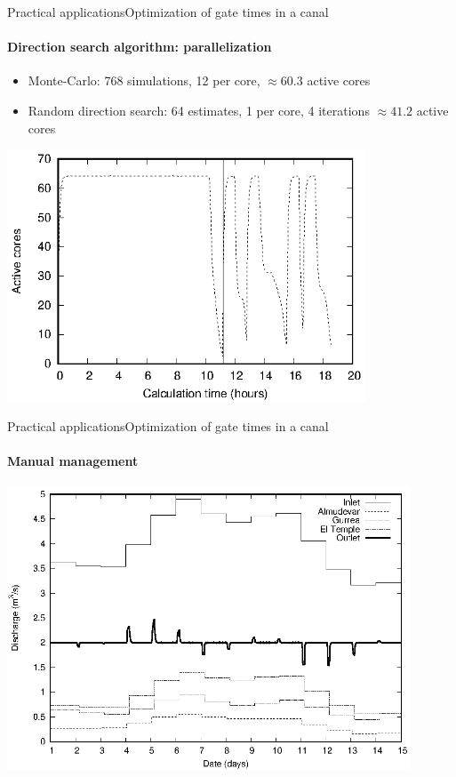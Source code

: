 \documentclass[10pt]{beamer}
\begin{document}
\begin{frame}{Practical applications}{Optimization of gate times in a canal}
	\framesubtitle{Direction search algorithm: parallelization}
	\begin{itemize}
		\item Monte-Carlo: 768 simulations, 12 per core, $\approx 60.3$ active cores
		\item Random direction search: 64 estimates, 1 per core, 4 iterations
			$\approx 41.2$ active cores
	\end{itemize}
	\includegraphics[width=0.8\textwidth]{load-swigs-mc-ra-768-1-64-4.eps}
\end{frame}

\begin{frame}{Practical applications}{Optimization of gate times in a canal}
	\framesubtitle{Manual management}
	\includegraphics[width=0.9\textwidth]{Violada-contributions.eps}
\end{frame}
\end{document}
